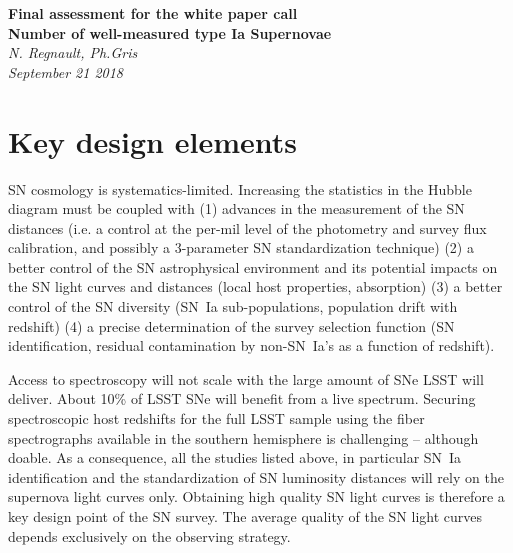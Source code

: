 \documentclass [11pt,a4paper]{article}
\begin{document}
\renewcommand\appendix{\par
  \setcounter{section}{0}
  \setcounter{subsection}{0}
  \setcounter{figure}{0}
  \setcounter{table}{0}
  \renewcommand\thesection{Appendix} %
  \renewcommand\thefigure{\Alph{section}\arabic{figure}}
  \renewcommand\thetable{\Alph{section}\arabic{table}} 
}

\begin{titlepage}
   \begin{center}
      \Large\textbf{Final assessment for the white paper call}\\
        
      \Large\textbf{Number of well-measured type Ia Supernovae}\\
		  
      \large\textit{N. Regnault, Ph.Gris} \\
	
      \large\textit{September 21 2018}
   \end{center}
\end{titlepage}


\tableofcontents



\section{Key design elements}

SN cosmology is systematics-limited. Increasing the statistics in the
Hubble diagram must be coupled with (1) advances in the measurement of
the SN distances (i.e.  a control at the per-mil level of the
photometry and survey flux calibration, and possibly a 3-parameter SN
standardization technique) (2) a better control of the SN
astrophysical environment and its potential impacts on the SN
light curves and distances (local host properties, absorption) (3) a
better control of the SN diversity (SN~Ia sub-populations, population
drift with redshift) (4) a precise determination of the survey
selection function (SN identification, residual contamination by
non-SN~Ia's as a function of redshift).

Access to spectroscopy will not scale with the large amount of SNe
LSST will deliver.  About 10\% of LSST SNe will benefit from a live
spectrum.  Securing spectroscopic host redshifts for the full LSST
sample using the fiber spectrographs available in the southern
hemisphere is challenging -- although doable.  As a consequence, all
the studies listed above, in particular SN~Ia identification and the
standardization of SN luminosity distances will rely on the supernova
light curves only.  Obtaining high quality SN light curves is
therefore a key design point of the SN survey.  The average quality of
the SN light curves depends exclusively on the observing strategy.
\end{document}
